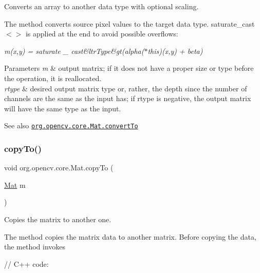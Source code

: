 Converts an array to another data type with optional scaling.

The method converts source pixel values to the target data type. {\ttfamily saturate\+\_\+cast$<$$>$} is applied at the end to avoid possible overflows\+:

{\itshape m(x,y) = saturate \+\_\+ cast\&ltr\+Type\&gt(alpha($\ast$this)(x,y) + beta)}


\begin{DoxyParams}{Parameters}
{\em m} & output matrix; if it does not have a proper size or type before the operation, it is reallocated. \\
\hline
{\em rtype} & desired output matrix type or, rather, the depth since the number of channels are the same as the input has; if {\ttfamily rtype} is negative, the output matrix will have the same type as the input.\\
\hline
\end{DoxyParams}
\begin{DoxySeeAlso}{See also}
\href{http://docs.opencv.org/modules/core/doc/basic_structures.html#mat-convertto}{\tt org.\+opencv.\+core.\+Mat.\+convert\+To} 
\end{DoxySeeAlso}
\mbox{\label{classorg_1_1opencv_1_1core_1_1_mat_aa2d63f03533282ef5bd1f8dc0cbcbc0b}} 
\subsubsection{\texorpdfstring{copy\+To()}{copyTo()}\hspace{0.1cm}{\footnotesize\ttfamily [1/2]}}
{\footnotesize\ttfamily void org.\+opencv.\+core.\+Mat.\+copy\+To (\begin{DoxyParamCaption}\item[{\mbox{\hyperlink{classorg_1_1opencv_1_1core_1_1_mat}{Mat}}}]{m }\end{DoxyParamCaption})}

Copies the matrix to another one.

The method copies the matrix data to another matrix. Before copying the data, the method invokes {\ttfamily }

{\ttfamily }

{\ttfamily }

{\ttfamily // C++ code\+:}

